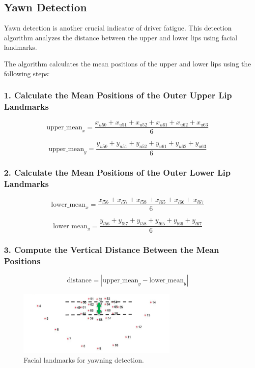 \newpage

\subsection{Yawn Detection}

Yawn detection is another crucial indicator of driver fatigue. This detection algorithm analyzes the distance between the upper and lower lips using facial landmarks.

The algorithm calculates the mean positions of the upper and lower lips using the following steps:

\subsubsection*{1. Calculate the Mean Positions of the Outer Upper Lip Landmarks}

\[
\text{upper\_mean}_x = \frac{x_{u50} + x_{u51} + x_{u52} + x_{u61} + x_{u62} + x_{u63}}{6}
\]

\[
\text{upper\_mean}_y = \frac{y_{u50} + y_{u51} + y_{u52} + y_{u61} + y_{u62} + y_{u63}}{6}
\]

\subsubsection*{2. Calculate the Mean Positions of the Outer Lower Lip Landmarks}

\[
\text{lower\_mean}_x = \frac{x_{l56} + x_{l57} + x_{l58} + x_{l65} + x_{l66} + x_{l67}}{6}
\]

\[
\text{lower\_mean}_y = \frac{y_{l56} + y_{l57} + y_{l58} + y_{l65} + y_{l66} + y_{l67}}{6}
\]

\subsubsection*{3. Compute the Vertical Distance Between the Mean Positions}

\[
\text{distance} = \left| \text{upper\_mean}_y - \text{lower\_mean}_y \right|
\]

\begin{figure}[H]
    \centering
    \includegraphics[width=0.7\textwidth]{Images/1_AI/yawn_distance.png}
    \caption{Facial landmarks for yawning detection.}
    \label{fig:yawn_distance}
\end{figure}

